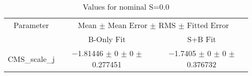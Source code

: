 \begin{table}
\centering
\caption{Values for nominal S=0.0}
\begin{tabular}{ccc}
\toprule
Parameter & \multicolumn{2}{c}{Mean $\pm$ Mean Error $\pm$ RMS $\pm$ Fitted Error}\\
 & B-Only Fit & S+B Fit\\
\midrule
CMS\_scale\_j & \num{-1.81446} $\pm$ \num{0} $\pm$ \num{0} $\pm$ \num{0.277451} & \num{-1.7405} $\pm$ \num{0} $\pm$ \num{0} $\pm$ \num{0.376732}\\
\bottomrule
\end{tabular}
\end{table}